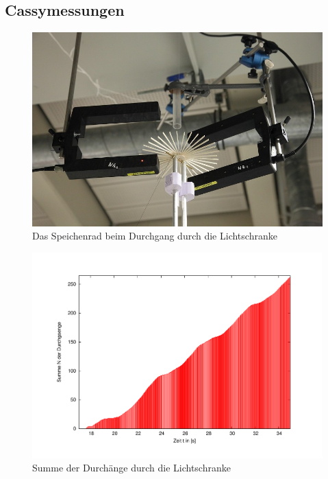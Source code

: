 \documentclass[halfparskip, 11pt]{scrartcl}
\begin{document}
\subsection{Cassymessungen} %
\begin{figure}[ht]
\centering
\includegraphics[width=1.\textwidth]{lichtschranke.jpg}
\caption{Das Speichenrad beim Durchgang durch die Lichtschranke}
\label{lichtschranke}
\end{figure}
\begin{figure}[th]
\centering
\includegraphics[width=1.\textwidth]{durchg29-cassy.pdf}
\vspace{-2\baselineskip}
\caption{Summe der Durch\"ange durch die Lichtschranke}
\label{durchg29-cassy}
\end{figure}
\end{document}
